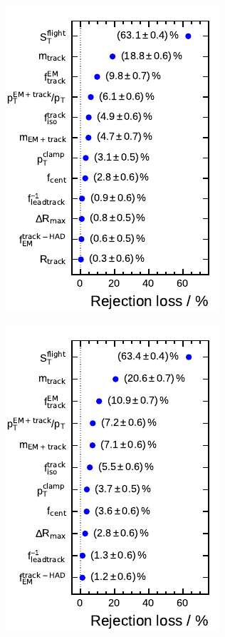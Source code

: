 \begin{figure}[htb]
  \centering
  \begin{subfigure}[t]{0.32\textwidth}
    \centering
    \includegraphics{./figures/bdt_perf/var_importance/3p_iter1.pdf}
  \end{subfigure}
  \begin{subfigure}[t]{0.32\textwidth}
    \centering
    \includegraphics{./figures/bdt_perf/var_importance/3p_iter2.pdf}

\end{subfigure}
\end{figure}
